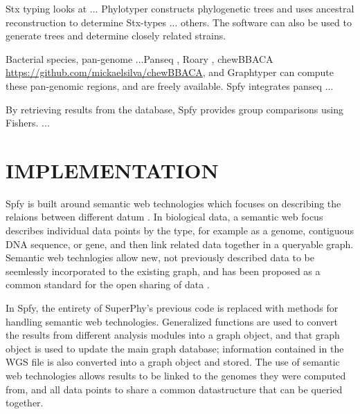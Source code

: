 \documentclass[a4,center,fleqn]{NAR}
\begin{document}
Stx typing looks at ...
Phylotyper constructs phylogenetic trees and uses ancestral reconstruction to determine Stx-types ... others.
The software can also be used to generate trees and determine closely related strains.

Bacterial species, pan-genome ...Panseq \cite{laing2010pan}, Roary \cite{page2015roary}, chewBBACA \url{https://github.com/mickaelsilva/chewBBACA}, and Graphtyper \cite{Eggertsson148403} can compute these pan-genomic regions, and are freely available.
Spfy integrates panseq ...

By retrieving results from the database, Spfy provides group comparisons using Fishers.
...


\section{IMPLEMENTATION}
Spfy is built around semantic web technologies which focuses on describing the relaions between different datum \cite{berners2001semantic}.
In biological data, a semantic web focus describes individual data points by the type, for example as a genome, contiguous DNA sequence, or gene, and then link related data together in a queryable graph.
Semantic web technlogies allow new, not previously described data to be seemlessly incorporated to the existing graph, and has been proposed as a common standard for the open sharing of data \cite{horrocks2005semantic}.

In Spfy, the entirety of SuperPhy's previous code is replaced with methods for handling semantic web technologies.
Generalized functions are used to convert the results from different analysis modules into a graph object, and that graph object is used to update the main graph database; information contained in the WGS file is also converted into a graph object and stored.
The use of semantic web technologies allows results to be linked to the genomes they were computed from, and all data points to share a common datastructure that can be queried together.
\end{document}
